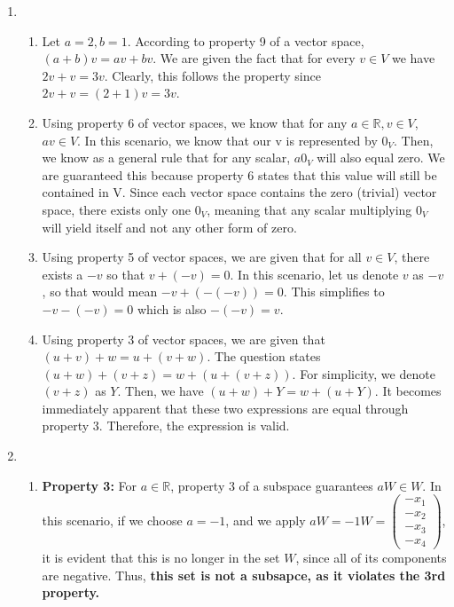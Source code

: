 \documentclass{article}
\begin{document}
\begin{enumerate}
\begin{enumerate}
\end{enumerate}

\item

\begin{enumerate}

\item Let $a = 2, b = 1$. According to property 9 of a vector space, $(a + b)v = av + bv$. We are given the fact that for every $v \in V$ we have $2v + v = 3v$. Clearly, this follows the property since $2v + v = (2 + 1) v = 3v$.

\item Using property 6 of vector spaces, we know that for any $a \in \mathbb{R}, v \in V$, $a v \in V$. In this scenario, we know that our v is represented by $0_V$. Then, we know as a general rule that for any scalar, $a 0_V$ will also equal zero. We are guaranteed this because property 6 states that this value will still be contained in V. Since each vector space contains the zero (trivial) vector space, there exists only one $0_V$, meaning that any scalar multiplying $0_V$ will yield itself and not any other form of zero.

\item Using property 5 of vector spaces, we are given that for all $v \in V$, there exists a $-v$ so that $v + (-v) = 0$. In this scenario, let us denote $v$ as $-v$, so that would mean $-v + (-(-v)) = 0$. This simplifies to $-v -(-v) = 0$ which is also $-(-v) = v$.

\item Using property 3 of vector spaces, we are given that $(u + v) + w = u + (v + w)$. The question states $(u + w) + (v + z ) = w + (u + (v + z))$. For simplicity, we denote $(v + z)$ as $Y$. Then, we have $(u + w) + Y = w + (u + Y)$. It becomes immediately apparent that these two expressions are equal through property 3. Therefore, the expression is valid.

\end{enumerate}

\item

\begin{enumerate}

\item \textbf{Property 3:} For $a \in \mathbb{R}$, property 3 of a subspace guarantees  $aW \in W$. In this scenario, if we choose $a = -1$, and we apply $aW = -1W = 
\left(\begin{array}{c} -x_1\\-x_2\\-x_3\\-x_4 \end{array} \right)$, it is evident that this is no longer in the set $W$, since all of its components are negative. Thus, \textbf{this set is not a subsapce, as it violates the 3rd property.}


\end{enumerate}
\end{enumerate}
\end{document}
